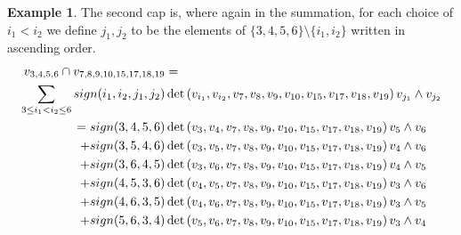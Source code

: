 \documentclass[10pt]{amsart}
\theoremstyle{definition}
\theoremstyle{plain}
\theoremstyle{plain}
\theoremstyle{definition}
\newtheorem{example}[cdrthm]{Example}
\theoremstyle{remark}
\theoremstyle{plain}
\theoremstyle{plain}
\theoremstyle{plain}
\numberwithin{equation}{section}
\begin{document}
\begin{example}
The second cap is, where again in the summation, for each choice of $i_1 < i_2$ we define $j_1,j_{2}$ to be the elements of $\{3,4,5,6\} \setminus \{i_1,i_2\}$ written in ascending order. 
\begin{align*}
v_{3,4,5,6} \cap v_{7,8,9,10,15,17,18,19} &= \\ \sum_{3\leq i_1 < i_2\leq 6} {\rm sign}(i_1,i_2,j_1,j_2) &\det\left(v_{i_1},v_{i_2}, v_{7}, v_{8}, v_{9}, v_{10}, v_{15}, v_{17}, v_{18}, v_{19}\right)v_{j_1} \wedge v_{j_{2}}\nonumber \\
= {\rm sign}(3,4,5,6) &\det\left(v_3,v_4, v_{7}, v_{8}, v_{9}, v_{10}, v_{15}, v_{17}, v_{18}, v_{19}\right)v_5 \wedge  v_6 \nonumber \\
+ {\rm sign}(3,5,4,6) &\det\left(v_{3},v_5, v_7, v_8, v_9, v_{10}, v_{15}, v_{17}, v_{18}, v_{19}\right)v_4 \wedge v_6 \nonumber \\
+ {\rm sign}(3,6,4,5) &\det\left(v_3,v_6, v_7, v_8, v_9, v_{10}, v_{15}, v_{17}, v_{18}, v_{19}\right)v_4 \wedge v_5 \nonumber \\
+ {\rm sign}(4,5,3,6) &\det\left(v_4,v_5,v_7, v_8, v_9, v_{10}, v_{15}, v_{17}, v_{18}, v_{19}\right)v_3 \wedge v_6 \nonumber \\
+ {\rm sign}(4,6,3,5) &\det\left(v_4,v_6,v_7, v_8, v_9, v_{10}, v_{15}, v_{17}, v_{18}, v_{19}\right)v_3 \wedge v_5 \nonumber \\
+ {\rm sign}(5,6,3,4) &\det\left(v_5,v_6,v_7, v_8, v_9, v_{10}, v_{15}, v_{17}, v_{18}, v_{19}\right) v_3 \wedge v_4 \nonumber
\end{align*}



\end{example}
\end{document}
